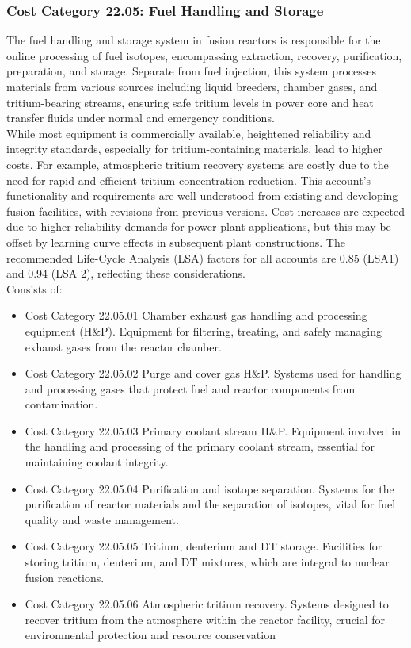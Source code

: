 \subsubsection{Cost Category 22.05: Fuel Handling and Storage}

The fuel handling and storage system in fusion reactors is responsible for the online processing of fuel isotopes, encompassing extraction, recovery, purification, preparation, and storage. Separate from fuel injection, this system processes materials from various sources including liquid breeders, chamber gases, and tritium-bearing streams, ensuring safe tritium levels in power core and heat transfer fluids under normal and emergency conditions.  \\

While most equipment is commercially available, heightened reliability and integrity standards, especially for tritium-containing materials, lead to higher costs. For example, atmospheric tritium recovery systems are costly due to the need for rapid and efficient tritium concentration reduction. This account's functionality and requirements are well-understood from existing and developing fusion facilities, with revisions from previous versions. Cost increases are expected due to higher reliability demands for power plant applications, but this may be offset by learning curve effects in subsequent plant constructions. The recommended Life-Cycle Analysis (LSA) factors for all accounts are 0.85 (LSA1) and 0.94 (LSA 2), reflecting these considerations.\\

  Consists of: 

\begin{itemize}
\item Cost Category 22.05.01 Chamber exhaust gas handling and processing equipment (H\&P).  Equipment for filtering, treating, and safely managing exhaust gases from the reactor chamber.
\item Cost Category 22.05.02 Purge and cover gas H\&P. Systems used for handling and processing gases that protect fuel and reactor components from contamination.
\item Cost Category 22.05.03 Primary coolant stream H\&P. Equipment involved in the handling and processing of the primary coolant stream, essential for maintaining coolant integrity.
\item Cost Category 22.05.04 Purification and isotope separation. Systems for the purification of reactor materials and the separation of isotopes, vital for fuel quality and waste management.
\item Cost Category 22.05.05 Tritium, deuterium and DT storage. Facilities for storing tritium, deuterium, and DT mixtures, which are integral to nuclear fusion reactions. 
\item Cost Category 22.05.06 Atmospheric tritium recovery. Systems designed to recover tritium from the atmosphere within the reactor facility, crucial for environmental protection and resource conservation
\end{itemize}

